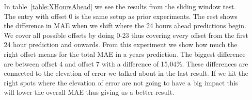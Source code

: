 In table~\ref{table:XHoursAhead} we see the results from the sliding window test. The entry with offset 0 is the same setup as prior experiments. The rest shows the difference in MAE when we shift where the 24 hours ahead predictions begin. We cover all possible offsets by doing 0-23 thus covering every offset from the first 24 hour prediction and onwards. From this experiment we show how much the right offset means for the total MAE in a years prediction. The biggest difference are between offset 4 and offset 7 with a difference of 15,04\%. These differences are connected to the elevation of error we talked about in the last result. If we hit the right spots where the elevation of error are not going to have a big impact this will lower the overall MAE thus giving us a better result.  

\begin{table}[H]
\centering  %
\end{table}
